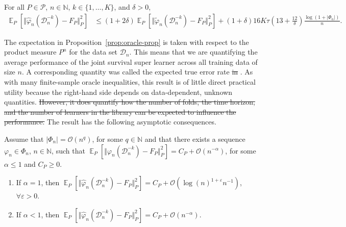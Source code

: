 \documentclass[alpha-refs]{wiley-article}
\DeclareMathOperator{\E}{\mathbb{E}} %
\newcommand{\N}{\mathbb{N}}
\renewcommand{\phi}{\varphi}
\renewcommand{\epsilon}{\varepsilon}
\newcommand\bigO{\ensuremath{\mathcal{O}}}
\newcommand{\1}{\mathbb{1}} %
\newcommand{\data}{\ensuremath{\mathcal{D}}}
\providecommand{\DIFaddtex}[1]{{\protect\color{blue}\uwave{#1}}} %
\providecommand{\DIFdeltex}[1]{{\protect\color{red}\sout{#1}}}                      %
\providecommand{\DIFaddbegin}{} %
\providecommand{\DIFaddend}{} %
\providecommand{\DIFdelbegin}{} %
\providecommand{\DIFdelend}{} %
\providecommand{\DIFadd}[1]{\texorpdfstring{\DIFaddtex{#1}}{#1}} %
\providecommand{\DIFdel}[1]{\texorpdfstring{\DIFdeltex{#1}}{}} %
\begin{document}
\begin{proposition}
  \label{prop:oracle-prop}
  For all \(P\in\mathcal{P}\), \( n \in \N \), \( k \in \{1, \dots, K\} \),
  and $\delta>0$,
  \begin{align*}
    \E_{P}{\left[ \Vert \hat{\phi}_n(\data_n^{-k}) - F_P \Vert_{P}^2 \right]}
    & \leq (1 + 2\delta)
      \E_{P}{\left[ \Vert \tilde{\phi}_n(\data_n^{-k}) - F_P \Vert_{P}^2 \right]}
    \DIFdelbegin %
\DIFdelend %
      + (1+ \delta) 16   K \tau
      \left(
      13 + \frac{12}{\delta}
      \right)
      \frac{\log(1 + |\Phi_n|)}{n}.
  \end{align*}
\end{proposition}

The expectation in Proposition~\ref{prop:oracle-prop} is taken with
respect to the product measure \( P^{n} \) for the data set
\( \data_n \). This means that we are quantifying the average
performance of the joint survival super learner across all training
data of size \(n\). A corresponding quantity was called the expected
true error rate \DIFdelbegin \DIFdel{in }\DIFdelend \DIFaddbegin \DIFadd{by }\DIFaddend \cite{efron_and_tibshirani97}. As with many
finite-sample oracle inequalities, this result is of little direct
practical utility because the right-hand side depends on
data-dependent, unknown quantities. \DIFdelbegin \DIFdel{However, it does quantify how the
number of folds, the time horizon, and the number of learners in the
library can be expected to influence the performance. }\DIFdelend The result has the following
asymptotic consequences.

\begin{corollary}
  \label{cor:asymp-cons}
  Assume that \( |\Phi_n| = \bigO(n^q)\), for some
  \( q \in \N \) and that there exists a sequence
  \( \phi_n \in \Phi_n \), \( n \in \N \), such that
  \(  \E_{P}{\left[ \Vert
      \phi_n(\data_n^{-k}) - F_P \Vert_{P}^2 \right]} = C_P +
  \bigO(n^{-\alpha}) \), for some \( \alpha\leq 1 \) and
  \( C_P \geq 0 \).
  \begin{enumerate}[label=(\alph*)]
  \item\label{item:1} If $\alpha=1$, then
    \(
    \E_{P}{\left[ \Vert
        \hat{\phi}_n(\data_n^{-k}) - F_P \Vert_{P}^2 \right]} = C_P +
    \bigO(\log(n)^{1+\epsilon}n^{-1}) \), $\forall\epsilon>0$.
  \item\label{item:2} If $\alpha<1$, then
    \(
    \E_{P}{\left[ \Vert
        \hat{\phi}_n(\data_n^{-k}) - F_P \Vert_{P}^2 \right]} = C_P +
    \bigO(n^{-\alpha}) \).
  \end{enumerate}
\end{corollary}
\end{document}
